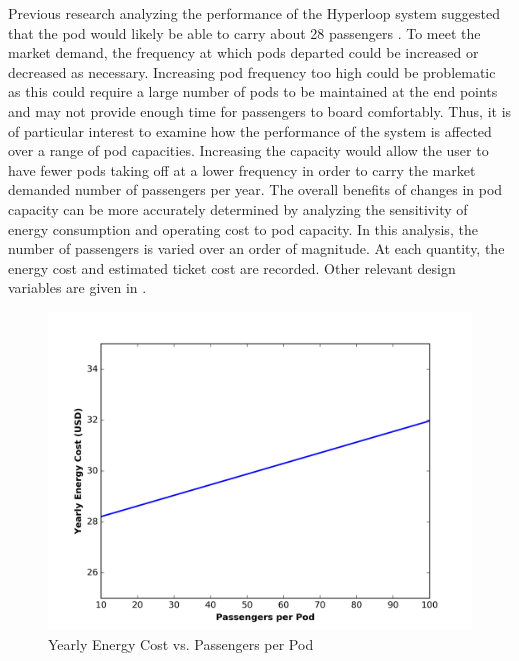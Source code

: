 Previous research analyzing the performance of the Hyperloop system suggested that the pod would likely be able to carry about 28 passengers \cite{Musk}. To meet the market demand, the frequency at which pods departed could be increased or decreased as necessary. Increasing pod frequency too high could be problematic as this could require a large number of pods to be maintained at the end points and may not provide enough time for passengers to board comfortably. Thus, it is of particular interest to examine how the performance of the system is affected over a range of pod capacities. Increasing the capacity would allow the user to have fewer pods taking off at a lower frequency in order to carry the market demanded number of passengers per year. The overall benefits of changes in pod capacity can be more accurately determined by analyzing the sensitivity of energy consumption and operating cost to pod capacity.
In this analysis, the number of passengers is varied over an order of magnitude. At each quantity, the energy cost and estimated ticket cost are recorded. Other relevant design variables are given in .
\begin{figure}
	\centering
	\includegraphics{../../images/graphs/capacity_trades/passengers_vs_energy.png}
	\caption{Yearly Energy Cost vs. Passengers per Pod}
	\label{fig:energy_cost_vs_passengers}
\end{figure}
